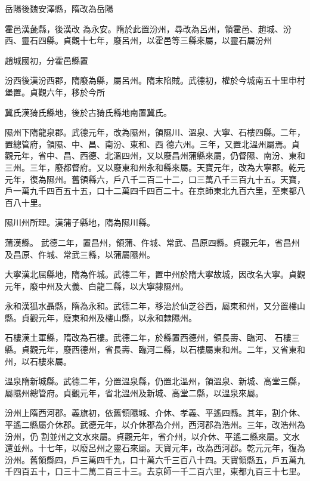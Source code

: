 \begin{pinyinscope}
 岳陽後魏安澤縣，隋改為岳陽



 霍邑漢彘縣，後漢改
 為永安。隋於此置汾州，尋改為呂州，領霍邑、趙城、汾西、靈石四縣。貞觀十七年，廢呂州，以霍邑等三縣來屬，以靈石屬汾州



 趙城國初，分霍邑縣置



 汾西後漢汾西郡，隋廢為縣，屬呂州。隋末陷賊。武德初，權於今城南五十里申村堡置。貞觀六年，移於今所



 冀氏漢猗氏縣地，後於古猗氏縣地南置冀氏。



 隰州下隋龍泉郡。武德元年，改為隰州，領隰川、溫泉、大寧、石樓四縣。二年，置總管府，領隰、中、昌、南汾、東和、西
 德六州。三年，又置北溫州屬焉。貞觀元年，省中、昌、西德、北溫四州，又以廢昌州蒲縣來屬，仍督隰、南汾、東和三州。三年，廢都督府。又以廢東和州永和縣來屬。天寶元年，改為大寧郡。乾元元年，復為隰州。舊領縣六，戶八千二百二十二，口三萬八千三百九十五。天寶，戶一萬九千四百五十五，口十二萬四千四百二十。在京師東北九百六里，至東都八百八十里。



 隰川州所理。漢蒲子縣地，隋為隰川縣。



 蒲漢縣。
 武德二年，置昌州，領蒲、仵城、常武、昌原四縣。貞觀元年，省昌州及昌原、仵城、常武三縣，以蒲屬隰州。



 大寧漢北屈縣地，隋為仵城。武德二年，置中州於隋大寧故城，因改名大寧。貞觀元年，廢中州及大義、白龍二縣，以大寧隸隰州。



 永和漢狐水聶縣，隋為永和。武德二年，移治於仙芝谷西，屬東和州，又分置樓山縣。貞觀元年，廢東和州及樓山縣，以永和隸隰州。



 石樓漢土軍縣，隋改為石樓。武德二年，於縣置西德州，領長壽、臨河、
 石樓三縣。貞觀元年，廢西德州，省長壽、臨河二縣，以石樓屬東和州。二年，又省東和州，以石樓來屬。



 溫泉隋新城縣。武德二年，分置溫泉縣，仍置北溫州，領溫泉、新城、高堂三縣，屬隰州總管府。貞觀元年，省北溫州及新城、高堂二縣，以溫泉來屬。



 汾州上隋西河郡。義旗初，依舊領隰城、介休、孝義、平遙四縣。其年，割介休、平遙二縣屬介休郡。武德元年，以介休郡為介州，西河郡為浩州。三年，改浩州為汾州，仍
 割並州之文水來屬。貞觀元年，省介州，以介休、平遙二縣來屬。文水還並州。十七年，以廢呂州之靈石來屬。天寶元年，改為西河郡。乾元元年，復為汾州。舊領縣四，戶三萬四千九，口十萬六千三百八十四。天寶領縣五，戶五萬九千四百五十，口三十二萬二百三十三。去京師一千二百六里，東都九百三十七里。




\end{pinyinscope}
